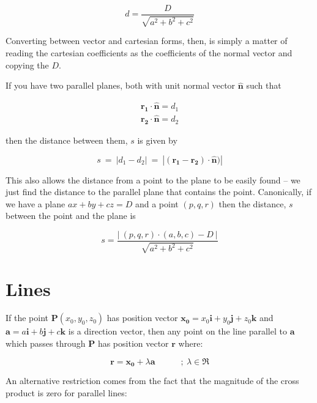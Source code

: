 \documentclass[a5paper]{article}
\begin{document}
\begin{equation}
  d = \frac{D}{\sqrt{a^2 + b^2 + c^2}}
\end{equation}

Converting between vector and cartesian forms, then, is simply a matter of
reading the cartesian coefficients as the coefficients of the normal vector and
copying the $D$.

If you have two parallel planes, both with unit normal vector $\bm{\hat{n}}$
such that

\begin{eqnarray}
  \bm{r_1} \cdot \bm{\hat{n}} = d_1 \nonumber\\
  \bm{r_2} \cdot \bm{\hat{n}} = d_2 \nonumber
\end{eqnarray}

then the distance between them, $s$ is given by

\begin{equation}
  s\ =\ |d_1 - d_2|\ =\ |(\bm{r_1} - \bm{r_2}) \cdot \bm{\hat{n}})| \label{eq:1.3}
\end{equation}

This also allows the distance from a point to the plane to be easily found -- we
just find the distance to the parallel plane that contains the point.
Canonically, if we have a plane $ax + by + cz = D$ and a point $(p, q, r)$ then
the distance, $s$ between the point and the plane is

\begin{equation}
  s = \frac{|\ (p, q, r) \cdot (a, b, c) - D\ |}{\sqrt{a^2 + b^2 + c^2}}
\end{equation}

\section{Lines}

If the point $\bm{P}(x_0, y_0, z_0)$ has position vector $\bm{x_0} = x_0\bm{i} +
y_0\bm{j} + z_0\bm{k}$ and $\bm{a} = a\bm{i} + b\bm{j} + c\bm{k}$ is a direction
vector, then any point on the line parallel to $\bm{a}$ which passes through
$\bm{P}$ has position vector $\bm{r}$ where:

\begin{equation}
  \bm{r} = \bm{x_0} + \lambda\bm{a} \hspace{3em};\ \lambda\in\Re
\end{equation}

An alternative restriction comes from the fact that the magnitude of the cross
product is zero for parallel lines:
\end{document}
